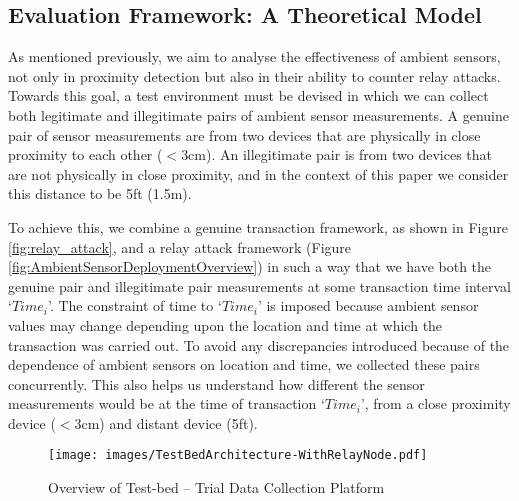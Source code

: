 \documentclass[runningheads,a4paper]{llncs}
\begin{document}
\subsection{Evaluation Framework: A Theoretical Model}
\label{sec:Evaluation-Framework-A-Theoretical-Model}
As mentioned previously, we aim to analyse the effectiveness of ambient sensors, not only in proximity detection but also in their ability to counter relay attacks. Towards this goal, a test environment must be devised in which we can collect both legitimate and illegitimate pairs of ambient sensor measurements. A genuine pair of sensor measurements are from two devices that are physically in close proximity to each other ($<$3cm). An illegitimate pair is from two devices that are not physically in close proximity, and in the context of this paper we consider this distance to be 5ft (1.5m). 




To achieve this, we combine a genuine transaction framework, as shown in Figure \ref{fig:relay_attack}, and a relay attack framework (Figure \ref{fig:AmbientSensorDeploymentOverview}) in such a way that we have both the genuine pair and illegitimate pair measurements at some transaction time interval `$Time_i$'. The constraint of time to `$Time_i$' is imposed because ambient sensor values may change depending upon the location and time at which the transaction was carried out. To avoid any discrepancies introduced because of the dependence of ambient sensors on location and time, we collected these pairs concurrently. This also helps us understand how different the sensor measurements would be at the time of transaction `$Time_i$', from a close proximity device ($<$3cm) and distant device (5ft). 


\begin{figure}[ht]
	\centering
		\texttt{[image: images/TestBedArchitecture-WithRelayNode.pdf]}
	\caption{Overview of Test-bed  -- Trial Data Collection Platform}
	\label{fig:TrialDataCollectionPlatform}
\end{figure}
\end{document}
